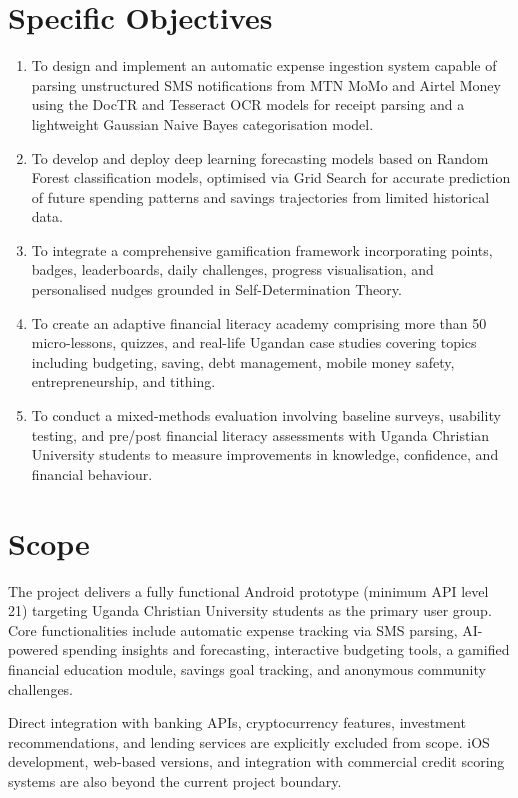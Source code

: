 \documentclass[12pt]{report}
\begin{document}
\section{Specific Objectives}

\begin{enumerate}
    \item To design and implement an automatic expense ingestion system capable of parsing unstructured SMS notifications from MTN MoMo and Airtel Money using the DocTR and Tesseract OCR models for receipt parsing and a lightweight Gaussian Naive Bayes categorisation model.
    \item To develop and deploy deep learning forecasting models based on Random Forest classification models, optimised via Grid Search for accurate prediction of future spending patterns and savings trajectories from limited historical data.
    \item To integrate a comprehensive gamification framework incorporating points, badges, leaderboards, daily challenges, progress visualisation, and personalised nudges grounded in Self-Determination Theory.
    \item To create an adaptive financial literacy academy comprising more than 50 micro-lessons, quizzes, and real-life Ugandan case studies covering topics including budgeting, saving, debt management, mobile money safety, entrepreneurship, and tithing.
    \item To conduct a mixed-methods evaluation involving baseline surveys, usability testing, and pre/post financial literacy assessments with Uganda Christian University students to measure improvements in knowledge, confidence, and financial behaviour.
\end{enumerate}

\section{Scope}

The project delivers a fully functional Android prototype (minimum API level 21) targeting Uganda Christian University students as the primary user group. Core functionalities include automatic expense tracking via SMS parsing, AI-powered spending insights and forecasting, interactive budgeting tools, a gamified financial education module, savings goal tracking, and anonymous community challenges.

Direct integration with banking APIs, cryptocurrency features, investment recommendations, and lending services are explicitly excluded from scope. iOS development, web-based versions, and integration with commercial credit scoring systems are also beyond the current project boundary.
\end{document}
